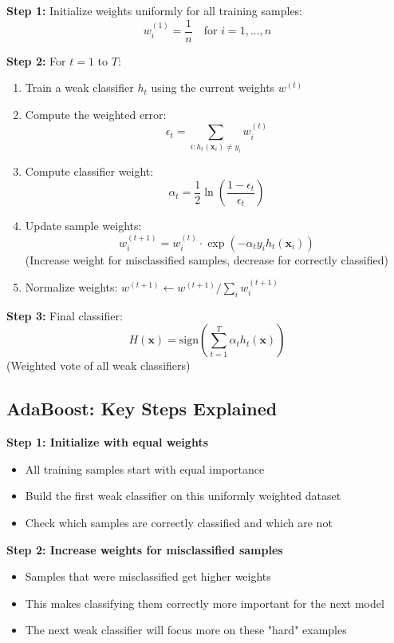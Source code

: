 \documentclass[11pt,a4paper]{article}
\theoremstyle{definition}
\theoremstyle{plain}
\theoremstyle{remark}
\begin{document}
\begin{tcolorbox}[colback=orange!5!white,colframe=orange!75!black,title=\textbf{AdaBoost Algorithm}]
\textbf{Step 1:} Initialize weights uniformly for all training samples:
\[
w_i^{(1)} = \frac{1}{n} \quad \text{for } i = 1, \ldots, n
\]

\textbf{Step 2:} For \(t = 1\) to \(T\):
\begin{enumerate}
    \item Train a weak classifier \(h_t\) using the current weights \(w^{(t)}\)
    
    \item Compute the weighted error:
    \[
    \epsilon_t = \sum_{i: h_t(\mathbf{x}_i) \neq y_i} w_i^{(t)}
    \]
    
    \item Compute classifier weight:
    \[
    \alpha_t = \frac{1}{2} \ln\left(\frac{1 - \epsilon_t}{\epsilon_t}\right)
    \]
    
    \item Update sample weights:
    \[
    w_i^{(t+1)} = w_i^{(t)} \cdot \exp\left(-\alpha_t y_i h_t(\mathbf{x}_i)\right)
    \]
    (Increase weight for misclassified samples, decrease for correctly classified)
    
    \item Normalize weights: \(w^{(t+1)} \leftarrow w^{(t+1)} / \sum_i w_i^{(t+1)}\)
\end{enumerate}

\textbf{Step 3:} Final classifier:
\[
H(\mathbf{x}) = \text{sign}\left(\sum_{t=1}^{T} \alpha_t h_t(\mathbf{x})\right)
\]
(Weighted vote of all weak classifiers)
\end{tcolorbox}

\subsection{AdaBoost: Key Steps Explained}

\textbf{Step 1: Initialize with equal weights}
\begin{itemize}
    \item All training samples start with equal importance
    \item Build the first weak classifier on this uniformly weighted dataset
    \item Check which samples are correctly classified and which are not
\end{itemize}

\textbf{Step 2: Increase weights for misclassified samples}
\begin{itemize}
    \item Samples that were misclassified get higher weights
    \item This makes classifying them correctly more important for the next model
    \item The next weak classifier will focus more on these "hard" examples
\end{itemize}
\end{document}
